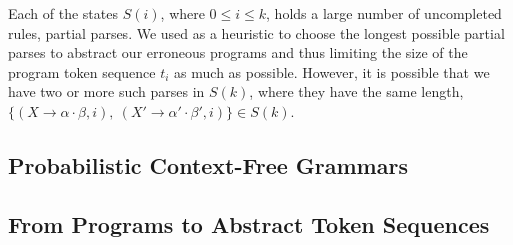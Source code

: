  Each of the states $S(i)$, where $0
\leq i \leq k$, holds a large number of uncompleted rules, \ie partial parses.
We used as a heuristic to choose the longest possible partial parses to abstract
our erroneous programs and thus limiting the size of the program token sequence
$t_i$ as much as possible. However, it is possible that we have two or more such
parses in $S(k)$, where they have the same length, \eg $\{(X \rightarrow \alpha
\cdot \beta, i),\ (X' \rightarrow \alpha' \cdot \beta', i)\} \in S(k)$.




\subsection{Probabilistic Context-Free Grammars}
\label{sec:prog-abstract:pcfg}




\subsection{From Programs to Abstract Token Sequences}





